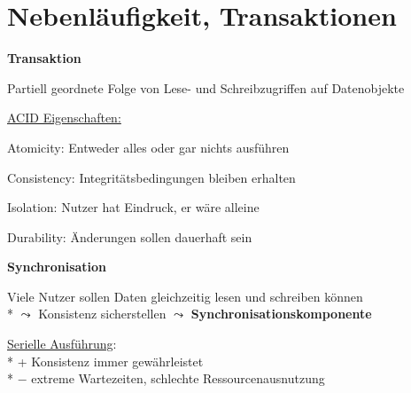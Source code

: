 \section{Nebenläufigkeit, Transaktionen}
\label{sec:parallel}

\textbf{Transaktion}
\begin{items}
	\item Partiell geordnete Folge von Lese- und Schreibzugriffen auf Datenobjekte
	\item \underline{ACID Eigenschaften:}
	\item Atomicity: Entweder alles oder gar nichts ausführen
	\item Consistency: Integritätsbedingungen bleiben erhalten
	\item Isolation: Nutzer hat Eindruck, er wäre alleine
	\item Durability: Änderungen sollen dauerhaft sein
\end{items}

\textbf{Synchronisation}
\begin{items}
	\item Viele Nutzer sollen Daten gleichzeitig lesen und schreiben können
		\\*
		\( \leadsto \) Konsistenz sicherstellen \( \leadsto \) \textbf{Synchronisationskomponente}
	\item \underline{Serielle Ausführung}: 
		\\*
		+ Konsistenz immer gewährleistet 
		\\*
		$-$ extreme Wartezeiten, schlechte Ressourcenausnutzung
\end{items}

